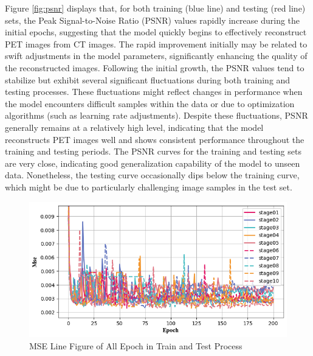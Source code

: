 \documentclass[twocolumn]{article}
\begin{document}
Figure \ref{fig:psnr} displays that, for both training (blue line) and testing (red line) sets, the Peak Signal-to-Noise Ratio (PSNR) values rapidly increase during the initial epochs, suggesting that the model quickly begins to effectively reconstruct PET images from CT images. The rapid improvement initially may be related to swift adjustments in the model parameters, significantly enhancing the quality of the reconstructed images. Following the initial growth, the PSNR values tend to stabilize but exhibit several significant fluctuations during both training and testing processes. These fluctuations might reflect changes in performance when the model encounters difficult samples within the data or due to optimization algorithms (such as learning rate adjustments). Despite these fluctuations, PSNR generally remains at a relatively high level, indicating that the model reconstructs PET images well and shows consistent performance throughout the training and testing periods. The PSNR curves for the training and testing sets are very close, indicating good generalization capability of the model to unseen data. Nonetheless, the testing curve occasionally dips below the training curve, which might be due to particularly challenging image samples in the test set.

\begin{figure}[h]
	\centering
	\includegraphics[width=1.0\linewidth]{u-net/lung/csv_img_in_1_img_8_4/mse_comparison}
	\caption[mse]{MSE Line Figure of All Epoch in Train and Test Process}
	\label{fig:mse}
\end{figure}
\end{document}
